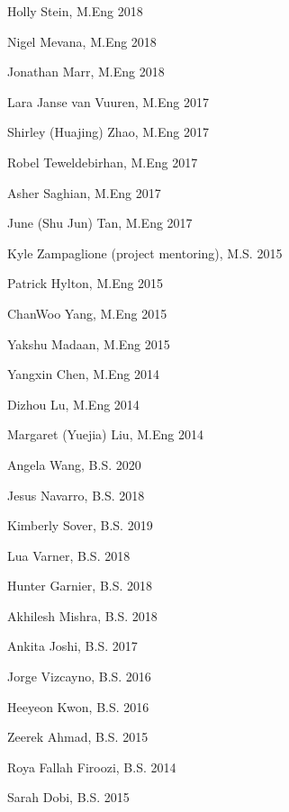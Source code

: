 \documentclass[letterpaper]{deedy-resume} %
\begin{document}
\begin{minipage}[t]{0.5\textwidth}

{}

\begin{tightitemize}

\item Holly Stein, M.Eng 2018
\item Nigel Mevana, M.Eng 2018
\item Jonathan Marr, M.Eng 2018
\item Lara Janse van Vuuren, M.Eng 2017
\item Shirley (Huajing) Zhao, M.Eng 2017
\item Robel Teweldebirhan, M.Eng 2017
\item Asher Saghian, M.Eng 2017
\item June (Shu Jun) Tan, M.Eng 2017
\item Kyle Zampaglione (project mentoring), M.S. 2015
\item Patrick Hylton, M.Eng 2015
\item ChanWoo Yang, M.Eng 2015
\item Yakshu Madaan, M.Eng 2015
\item Yangxin Chen, M.Eng 2014
\item Dizhou Lu, M.Eng 2014
\item Margaret (Yuejia) Liu, M.Eng 2014

\end{tightitemize}

\end{minipage}%
\begin{minipage}[t]{0.5\textwidth}

  \vspace{0.05cm}
  
{}

\begin{tightitemize}

\item Angela Wang, B.S. 2020
\item Jesus Navarro, B.S. 2018
\item Kimberly Sover, B.S. 2019
\item Lua Varner,  B.S. 2018
\item Hunter Garnier, B.S. 2018
\item Akhilesh Mishra, B.S. 2018
\item Ankita Joshi, B.S. 2017
\item Jorge Vizcayno, B.S. 2016
\item Heeyeon Kwon, B.S. 2016
\item Zeerek Ahmad, B.S. 2015
\item Roya Fallah Firoozi, B.S. 2014
\item Sarah Dobi, B.S. 2015


\end{tightitemize}

\end{minipage}
\end{document}
